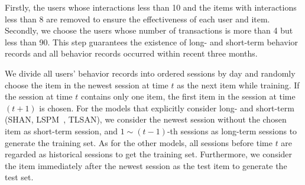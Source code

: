 \documentclass[preprint,12pt]{elsarticle}
\newcommand{\tool}{TLSAN\xspace}
\begin{document}
\begin{sloppypar}
Firstly, the users whose interactions less than 10 and the items with interactions less than 8 are removed to ensure the effectiveness of each user and item.
Secondly, we choose the users whose number of transactions is more than 4 but less than 90. This step guarantees the existence of long- and short-term behavior records and all behavior records occurred within recent three months.
\begin{table}[htbp]
	\caption{Amazon Datasets Statistics (After preprocessing)}
	\centering
	\label{tab:2}
\end{table}

We divide all users' behavior records into ordered sessions by day and randomly choose the item in the newest session at time $t$ as the next item while training. If the session at time $t$ contains only one item, the first item in the session at time $(t+1)$ is chosen. For the models that explicitly consider long- and short-term (SHAN, LSPM~\cite{lspm}, \tool), we consider the newest session without the chosen item as short-term session, and $1\sim (t-1)$-th sessions as long-term sessions to generate the training set. As for the other models, all sessions before time $t$ are regarded as historical sessions to get the  training set. Furthermore, we consider the item immediately after the newest session as the test item to generate the test set. 


\end{sloppypar}
\end{document}
